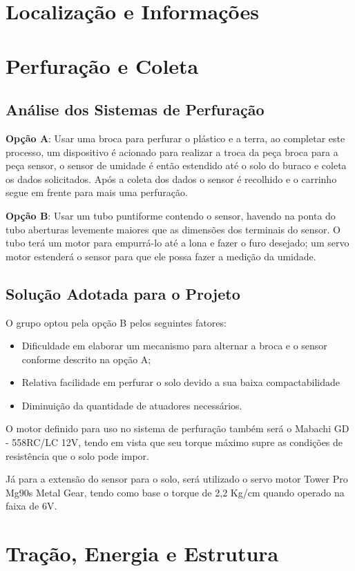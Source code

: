  
  \section{Localização e Informações}

  \section{Perfuração e Coleta}

  \subsection{Análise dos Sistemas de Perfuração}

  \textbf{Opção A}: Usar uma broca para perfurar o plástico e a terra, ao completar este
  processo, um dispositivo é acionado para realizar a troca da peça broca para
  a peça sensor, o sensor de umidade é então estendido até o solo do buraco e
  coleta os dados solicitados. Após a coleta dos dados o sensor é recolhido e o
  carrinho segue em frente para mais uma perfuração. 

  \textbf{Opção B}: Usar um tubo puntiforme contendo o sensor, havendo na ponta do tubo
  aberturas levemente maiores que as dimensões dos terminais do sensor. O tubo
  terá um motor para empurrá-lo até a lona e fazer o furo desejado; um servo
  motor estenderá o sensor para que ele possa fazer a medição da umidade.

  \subsection{Solução Adotada para o Projeto}
  
  O grupo optou pela opção B pelos seguintes fatores:

  \begin{itemize}
    \item Dificuldade em elaborar um mecanismo para alternar a broca e o sensor
    conforme descrito na opção A;
    \item Relativa facilidade em perfurar o solo devido a sua baixa compactabilidade
    \item Diminuição da quantidade de atuadores necessários.
  \end{itemize}

	O motor definido para uso no sistema de perfuração também será o
  Mabachi GD - 558RC/LC 12V, tendo em vista que seu torque máximo supre as
  condições de resistência que o solo pode impor.

  Já para a extensão do sensor para o solo, será utilizado o servo motor Tower
  Pro Mg90s Metal Gear, tendo como base o torque de 2,2 Kg/cm quando operado na faixa de 6V.

  \section{Tração, Energia e Estrutura}
